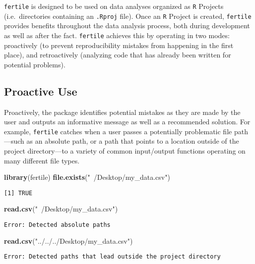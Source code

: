 \documentclass[12pt,twoside]{reedthesis}
\newenvironment{Shaded}{\begin{snugshade}}{\end{snugshade}}
\newcommand{\KeywordTok}[1]{\textcolor[rgb]{0.13,0.29,0.53}{\textbf{#1}}}
\newcommand{\StringTok}[1]{\textcolor[rgb]{0.31,0.60,0.02}{#1}}
\newcommand{\NormalTok}[1]{#1}
\begin{document}
\texttt{fertile} is designed to be used on data analyses organized as
\texttt{R} Projects (i.e.~directories containing an \texttt{.Rproj}
file). Once an \texttt{R} Project is created, \texttt{fertile} provides
benefits throughout the data analysis process, both during development
as well as after the fact. \texttt{fertile} achieves this by operating
in two modes: proactively (to prevent reproducibility mistakes from
happening in the first place), and retroactively (analyzing code that
has already been written for potential problems).

\subsection{Proactive Use}\label{proactive-use}

Proactively, the package identifies potential mistakes as they are made
by the user and outputs an informative message as well as a recommended
solution. For example, \texttt{fertile} catches when a user passes a
potentially problematic file path---such as an absolute path, or a path
that points to a location outside of the project directory---to a
variety of common input/output functions operating on many different
file types.
\begin{Shaded}
\begin{Highlighting}[]
\KeywordTok{library}\NormalTok{(fertile)}
\KeywordTok{file.exists}\NormalTok{(}\StringTok{"~/Desktop/my_data.csv"}\NormalTok{)}
\end{Highlighting}
\end{Shaded}
\begin{verbatim}
[1] TRUE
\end{verbatim}
\begin{Shaded}
\begin{Highlighting}[]
\KeywordTok{read.csv}\NormalTok{(}\StringTok{"~/Desktop/my_data.csv"}\NormalTok{)}
\end{Highlighting}
\end{Shaded}
\begin{verbatim}
Error: Detected absolute paths
\end{verbatim}
\begin{Shaded}
\begin{Highlighting}[]
\KeywordTok{read.csv}\NormalTok{(}\StringTok{"../../../Desktop/my_data.csv"}\NormalTok{)}
\end{Highlighting}
\end{Shaded}
\begin{verbatim}
Error: Detected paths that lead outside the project directory
\end{verbatim}
\end{document}
